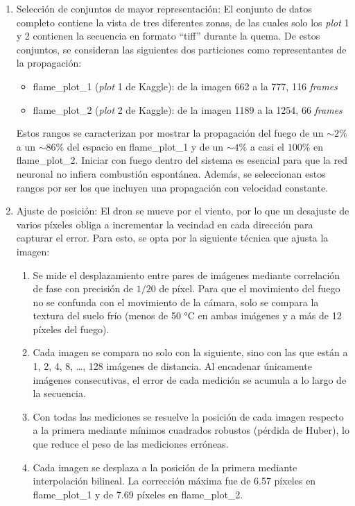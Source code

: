 \begin{enumerate}
	\item Selección de conjuntos de mayor representación: El conjunto de datos completo contiene la vista de tres diferentes zonas, de las cuales solo los \textit{plot} 1 y 2 contienen la secuencia en formato ``tiff'' durante la quema. De estos conjuntos, se consideran las siguientes dos particiones como representantes de la propagación:

	\begin{itemize}
		\item flame\_plot\_1 (\textit{plot} 1 de Kaggle): de la imagen 662 a la 777, 116 \textit{frames}
		\item flame\_plot\_2 (\textit{plot} 2 de Kaggle): de la imagen 1189 a la 1254, 66 \textit{frames}
	\end{itemize}
	
	Estos rangos se caracterizan por mostrar la propagación del fuego de un $\sim 2\%$ a un $\sim 86\%$ del espacio en flame\_plot\_1 y de un $\sim 4\%$ a casi el $100\%$ en flame\_plot\_2. Iniciar con fuego dentro del sistema es esencial para que la red neuronal no infiera combustión espontánea. Además, se seleccionan estos rangos por ser los que incluyen una propagación con velocidad constante. 

	\item Ajuste de posición: El dron se mueve por el viento, por lo que un desajuste de varios píxeles obliga a incrementar la vecindad en cada dirección para capturar el error. Para esto, se opta por la siguiente técnica que ajusta la imagen:

	\begin{enumerate}
		\item Se mide el desplazamiento entre pares de imágenes mediante correlación de fase con precisión de $1/20$ de píxel. Para que el movimiento del fuego no se confunda con el movimiento de la cámara, solo se compara la textura del suelo frío (menos de 50 °C en ambas imágenes y a más de 12 píxeles del fuego).
		\item Cada imagen se compara no solo con la siguiente, sino con las que están a 1, 2, 4, 8, \dots, 128 imágenes de distancia. Al encadenar únicamente imágenes consecutivas, el error de cada medición se acumula a lo largo de la secuencia.
		\item Con todas las mediciones se resuelve la posición de cada imagen respecto a la primera mediante mínimos cuadrados robustos (pérdida de Huber), lo que reduce el peso de las mediciones erróneas.
		\item Cada imagen se desplaza a la posición de la primera mediante interpolación bilineal. La corrección máxima fue de 6.57 píxeles en flame\_plot\_1 y de 7.69 píxeles en flame\_plot\_2.
	\end{enumerate}


\end{enumerate}
